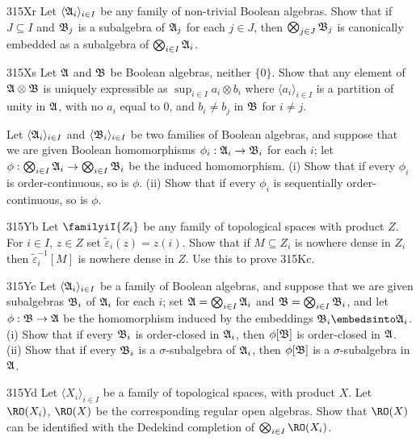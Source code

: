 {\spheader 315Xr Let $\langle\frak A_i\rangle_{i\in I}$ be any
family of non-trivial Boolean algebras.   Show that if $J\subseteq I$
and $\frak B_j$ is a subalgebra of $\frak A_j$ for each $j\in J$,
then $\bigotimes_{j\in J}\frak B_j$ is canonically embedded as a
subalgebra of $\bigotimes_{i\in I}\frak A_i$.

\spheader 315Xs Let $\frak A$ and $\frak B$ be Boolean algebras, neither
$\{0\}$.   Show that any element of $\frak A\otimes\frak B$ is uniquely
expressible as $\sup_{i\in I}a_i\otimes b_i$ where
$\langle a_i\rangle_{i\in I}$ is a partition of unity in $\frak A$, with
no $a_i$
equal to $0$, and $b_i\ne b_j$ in $\frak B$ for $i\ne j$.


Let $\langle\frak A_i\rangle_{i\in I}$ and
$\langle\frak B_i\rangle_{i\in I}$ be two families of Boolean algebras,
and suppose that we are given Boolean homomorphisms
$\phi_i:\frak A_i\to\frak B_i$ for each $i$;  let
$\phi:\bigotimes_{i\in I}\frak A_i\to\bigotimes_{i\in I}\frak B_i$ be
the induced homomorphism.   (i)
Show that if every $\phi_i$ is order-continuous, so is $\phi$.   (ii)
Show that if every $\phi_i$ is sequentially order-continuous, so is
$\phi$.

\spheader 315Yb Let $\familyiI{Z_i}$ be any family of topological spaces
with product $Z$.   For $i\in I$, $z\in Z$ set
$\tilde\varepsilon_i(z)=z(i)$.   Show that if $M\subseteq Z_i$ is
nowhere dense in $Z_i$ then $\tilde\varepsilon_i^{-1}[M]$ is nowhere
dense in $Z$.   Use this to prove 315Kc.

\spheader 315Yc Let $\langle\frak A_i\rangle_{i\in I}$ be a
family of Boolean algebras, and suppose that we are given subalgebras
$\frak B_i$ of $\frak A_i$ for each $i$;  set
$\frak A=\bigotimes_{i\in I}\frak A_i$ and
$\frak B=\bigotimes_{i\in I}\frak B_i$, and  let
$\phi:\frak B\to\frak A$ be the homomorphism induced by the embeddings
$\frak B_i\embedsinto\frak A_i$.   (i) Show that if every $\frak B_i$ is
order-closed in $\frak A_i$, then $\phi[\frak B]$ is order-closed in
$\frak A$.
(ii) Show that if every $\frak B_i$ is a $\sigma$-subalgebra of
$\frak A_i$, then $\phi[\frak B]$ is a $\sigma$-subalgebra in $\frak A$.

\spheader 315Yd Let $\langle X_i\rangle_{i\in I}$ be a family of
topological spaces, with product $X$.   Let $\RO(X_i)$, $\RO(X)$ be
the corresponding regular open algebras.   Show that $\RO(X)$ can be
identified with the Dedekind completion of
$\bigotimes_{i\in I}\RO(X_i)$.

}
